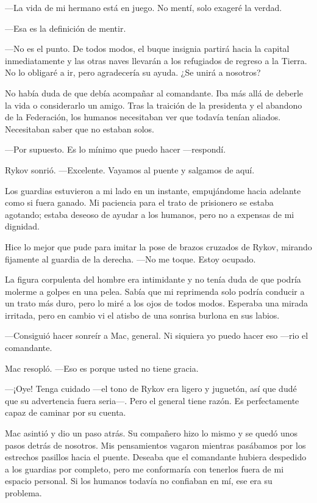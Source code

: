 —La vida de mi hermano está en juego. No mentí, solo exageré la verdad.

—Esa es la definición de mentir.

—No es el punto. De todos modos, el buque insignia partirá hacia la capital inmediatamente y las otras naves llevarán a los refugiados de regreso a la Tierra. No lo obligaré a ir, pero agradecería su ayuda. ¿Se unirá a nosotros?

No había duda de que debía acompañar al comandante. Iba más allá de deberle la vida o considerarlo un amigo. Tras la traición de la presidenta y el abandono de la Federación, los humanos necesitaban ver que todavía tenían aliados. Necesitaban saber que no estaban solos.

—Por supuesto. Es lo mínimo que puedo hacer —respondí.

Rykov sonrió. —Excelente. Vayamos al puente y salgamos de aquí.

Los guardias estuvieron a mi lado en un instante, empujándome hacia adelante como si fuera ganado. Mi paciencia para el trato de prisionero se estaba agotando; estaba deseoso de ayudar a los humanos, pero no a expensas de mi dignidad.

Hice lo mejor que pude para imitar la pose de brazos cruzados de Rykov, mirando fijamente al guardia de la derecha. —No me toque. Estoy ocupado.

La figura corpulenta del hombre era intimidante y no tenía duda de que podría molerme a golpes en una pelea. Sabía que mi reprimenda solo podría conducir a un trato más duro, pero lo miré a los ojos de todos modos. Esperaba una mirada irritada, pero en cambio vi el atisbo de una sonrisa burlona en sus labios.

—Consiguió hacer sonreír a Mac, general. Ni siquiera yo puedo hacer eso —rio el comandante.

Mac resopló. —Eso es porque usted no tiene gracia.

—¡Oye! Tenga cuidado —el tono de Rykov era ligero y juguetón, así que dudé que su advertencia fuera seria—. Pero el general tiene razón. Es perfectamente capaz de caminar por su cuenta.

Mac asintió y dio un paso atrás. Su compañero hizo lo mismo y se quedó unos pasos detrás de nosotros. Mis pensamientos vagaron mientras pasábamos por los estrechos pasillos hacia el puente. Deseaba que el comandante hubiera despedido a los guardias por completo, pero me conformaría con tenerlos fuera de mi espacio personal. Si los humanos todavía no confiaban en mí, ese era su problema.

